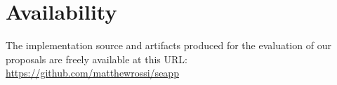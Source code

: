











\section*{Availability}
The implementation source and artifacts produced for the evaluation of
our proposals are freely available at this URL:
\url{https://github.com/matthewrossi/seapp}

